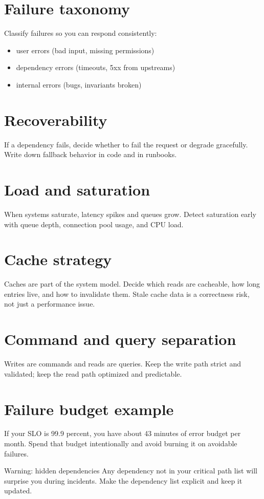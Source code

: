 \section{Failure taxonomy}
Classify failures so you can respond consistently:
\begin{itemize}[nosep]
  \item user errors (bad input, missing permissions)
  \item dependency errors (timeouts, 5xx from upstreams)
  \item internal errors (bugs, invariants broken)
\end{itemize}

\section{Recoverability}
If a dependency fails, decide whether to fail the request or degrade gracefully.
Write down fallback behavior in code and in runbooks.

\section{Load and saturation}
When systems saturate, latency spikes and queues grow.
Detect saturation early with queue depth, connection pool usage, and CPU load.

\section{Cache strategy}
Caches are part of the system model.
Decide which reads are cacheable, how long entries live, and how to invalidate them.
Stale cache data is a correctness risk, not just a performance issue.

\section{Command and query separation}
Writes are commands and reads are queries.
Keep the write path strict and validated; keep the read path optimized and predictable.

\section{Failure budget example}
If your SLO is 99.9 percent, you have about 43 minutes of error budget per month.
Spend that budget intentionally and avoid burning it on avoidable failures.

\begin{warningbox}{Warning: hidden dependencies}
Any dependency not in your critical path list will surprise you during incidents.
Make the dependency list explicit and keep it updated.
\end{warningbox}

